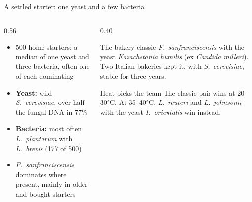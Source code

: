 \documentclass[aspectratio=169,11pt]{beamer}
\begin{document}
\begin{frame}{A settled starter: one yeast and a few bacteria}
  \begin{columns}[T]
    \begin{column}{0.56\textwidth}
      \small
      \begin{itemize}\setlength{\itemsep}{2pt}
        \item 500 home starters: a median of one yeast and three bacteria, often one of each dominating
        \item \textbf{Yeast:} wild \textit{S.\ cerevisiae}, over half the fungal DNA in 77\%
        \item \textbf{Bacteria:} most often \textit{L.\ plantarum} with \textit{L.\ brevis} (177 of 500)
        \item \textit{F.\ sanfranciscensis} dominates where present, mainly in older and bought starters
      \end{itemize}
    \end{column}
    \begin{column}{0.40\textwidth}
      \footnotesize
      \begin{block}{The bakery classic}
        \textit{F.\ sanfranciscensis} with the yeast \textit{Kazachstania humilis} (ex \textit{Candida milleri}). Two Italian bakeries kept it, with \textit{S.\ cerevisiae}, stable for three years.
      \end{block}
      \begin{block}{Heat picks the team}
        The classic pair wins at 20--30°C. At 35--40°C, \textit{L.\ reuteri} and \textit{L.\ johnsonii} with the yeast \textit{I.\ orientalis} win instead.
      \end{block}
    \end{column}
  \end{columns}
\end{frame}
\end{document}

